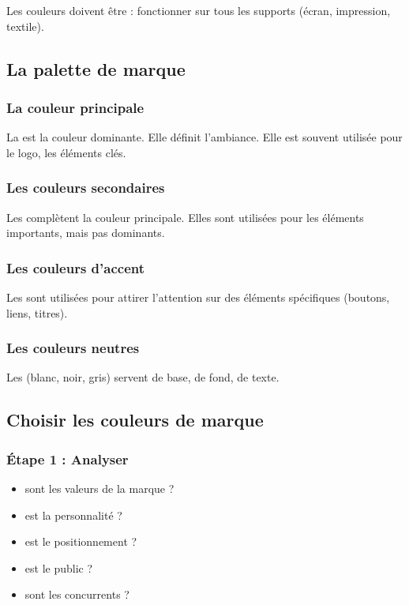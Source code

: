 Les couleurs doivent être  : fonctionner sur tous les supports (écran, impression, textile).

\subsection{La palette de marque}

\subsubsection{La couleur principale}

La  est la couleur dominante. Elle définit l'ambiance. Elle est souvent utilisée pour le logo, les éléments clés.

\subsubsection{Les couleurs secondaires}

Les  complètent la couleur principale. Elles sont utilisées pour les éléments importants, mais pas dominants.

\subsubsection{Les couleurs d'accent}

Les  sont utilisées pour attirer l'attention sur des éléments spécifiques (boutons, liens, titres).

\subsubsection{Les couleurs neutres}

Les  (blanc, noir, gris) servent de base, de fond, de texte.

\subsection{Choisir les couleurs de marque}

\subsubsection{Étape 1 : Analyser}

\begin{itemize}
    \item {} sont les valeurs de la marque ?
    \item {} est la personnalité ?
    \item {} est le positionnement ?
    \item {} est le public ?
    \item {} sont les concurrents ?
\end{itemize}


